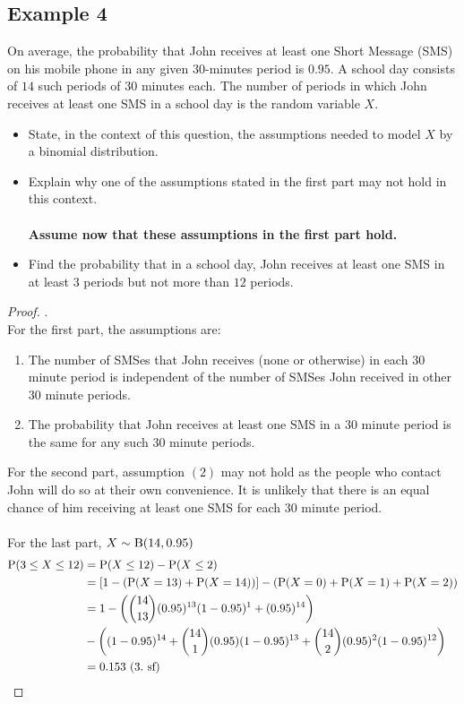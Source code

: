 \documentclass[../setup.tex]{subfiles}
\begin{document}
\subsection{Example 4}
\begin{example}
On average, the probability that John receives at least one Short Message (SMS) on his mobile phone in any given $30$-minutes period is $0.95$. A school day consists of $14$ such periods of $30$ minutes each. The number of periods in which John receives at least one SMS in a school day is the random variable $X$.
\begin{itemize}
	\item State, in the context of this question, the assumptions needed to model $X$ by a binomial distribution.
	\item Explain why one of the assumptions stated in the first part may not hold in this context. \\ \\
\textbf{Assume now that these assumptions in the first part hold.}
	\item Find the probability that in a school day, John receives at least one SMS in at least $3$ periods but not more than $12$ periods.
\end{itemize} 
\end{example}
\begin{proof} . \\
For the first part, the assumptions are:
\begin{enumerate}
	\item The number of SMSes that John receives (none or otherwise) in each $30$ minute period is independent of the number of SMSes John received in other $30$ minute periods.
	\item The probability that John receives at least one SMS in a $30$ minute period is the same for any such $30$ minute periods.
\end{enumerate}
For the second part, assumption $(2)$ may not hold as the people who contact John will do so at their own convenience. It is unlikely that there is an equal chance of him receiving at least one SMS for each $30$ minute period. \\ \\
For the last part, $X \sim \textup{B}(14, 0.95)$
\begin{align*}
\textup{P}(3\leq X\leq12) &= \textup{P}(X\leq12) - \textup{P}(X\leq2) \\
&= [1 - (\textup{P}(X=13) + \textup{P}(X=14))] - (\textup{P}(X=0) + \textup{P}(X=1) + \textup{P}(X=2)) \\
&= 1 -\left(\binom{14}{13}(0.95)^{13}(1-0.95)^1 + (0.95)^{14}\right) \\ &- \left((1-0.95)^{14} + \binom{14}{1}(0.95)(1-0.95)^{13} + \binom{14}{2}(0.95)^2(1-0.95)^{12}\right) \\
&= 0.153 \ (3. \text{ sf})
\end{align*}
\end{proof}
\clearpage
\end{document}
